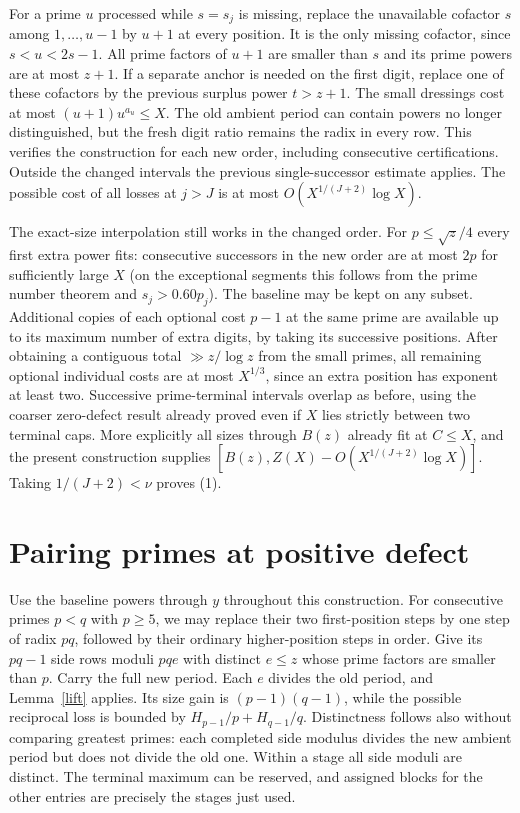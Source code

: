 \documentclass[11pt]{article}
\begin{document}
For a prime $u$ processed while $s=s_j$ is missing, replace the unavailable cofactor $s$ among $1,\ldots,u-1$ by $u+1$ at every position. It is the only missing cofactor, since $s<u<2s-1$. All prime factors of $u+1$ are smaller than $s$ and its prime powers are at most $z+1$. If a separate anchor is needed on the first digit, replace one of these cofactors by the previous surplus power $t>z+1$. The small dressings cost at most $(u+1)u^{a_u}\le X$. The old ambient period can contain powers no longer distinguished, but the fresh digit ratio remains the radix in every row. This verifies the construction for each new order, including consecutive certifications. Outside the changed intervals the previous single-successor estimate applies. The possible cost of all losses at $j>J$ is at most $O(X^{1/(J+2)}\log X)$.

The exact-size interpolation still works in the changed order. For $p\le\sqrt z/4$ every first extra power fits: consecutive successors in the new order are at most $2p$ for sufficiently large $X$ (on the exceptional segments this follows from the prime number theorem and $s_j>0.60p_j$). The baseline may be kept on any subset. Additional copies of each optional cost $p-1$ at the same prime are available up to its maximum number of extra digits, by taking its successive positions. After obtaining a contiguous total $\gg z/\log z$ from the small primes, all remaining optional individual costs are at most $X^{1/3}$, since an extra position has exponent at least two. Successive prime-terminal intervals overlap as before, using the coarser zero-defect result already proved even if $X$ lies strictly between two terminal caps. More explicitly all sizes through $B(z)$ already fit at $C\le X$, and the present construction supplies $[B(z), Z(X)-O(X^{1/(J+2)}\log X)]$. Taking $1/(J+2)<\nu$ proves (1).

\section{Pairing primes at positive defect}
Use the baseline powers through $y$ throughout this construction. For consecutive primes $p<q$ with $p\ge5$, we may replace their two first-position steps by one step of radix $pq$, followed by their ordinary higher-position steps in order. Give its $pq-1$ side rows moduli $pq e$ with distinct $e\le z$ whose prime factors are smaller than $p$. Carry the full new period. Each $e$ divides the old period, and Lemma~\ref{lift} applies. Its size gain is $(p-1)(q-1)$, while the possible reciprocal loss is bounded by $H_{p-1}/p+H_{q-1}/q$. Distinctness follows also without comparing greatest primes: each completed side modulus divides the new ambient period but does not divide the old one. Within a stage all side moduli are distinct. The terminal maximum can be reserved, and assigned blocks for the other entries are precisely the stages just used.
\end{document}
